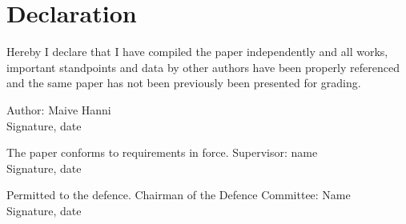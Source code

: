 \chapter*{Declaration}
\thispagestyle{empty}

Hereby I declare that I have compiled the paper independently and all works, important standpoints and data by other authors have been properly referenced and the same paper has not been previously been presented for grading.

Author: Maive Hanni \\
Signature, date


\vspace{2cm}

The paper conforms to requirements in force. \newline
Supervisor: name \\
Signature, date

\vspace{5cm}

Permitted to the defence. 
Chairman of the Defence Committee: Name \\
Signature, date

